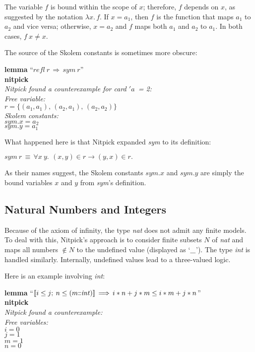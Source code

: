 \documentclass[a4paper,12pt]{article}
\def\Colon{\mathord{:\mkern-1.5mu:}}
\def\unk{{\_}}
\renewcommand\_{\hbox{\textunderscore\kern-.05ex}}
\begin{document}
The variable $f$ is bound within the scope of $x$; therefore, $f$ depends on
$x$, as suggested by the notation $\lambda x.\,f$. If $x = a_1$, then $f$ is the
function that maps $a_1$ to $a_2$ and vice versa; otherwise, $x = a_2$ and $f$
maps both $a_1$ and $a_2$ to $a_1$. In both cases, $f~x \not= x$.

The source of the Skolem constants is sometimes more obscure:

\prew
\textbf{lemma} ``$\mathit{refl}~r\,\Longrightarrow\, \mathit{sym}~r$'' \\
\textbf{nitpick} \\[2\smallskipamount]
\slshape
Nitpick found a counterexample for \textit{card} $'a$~= 2: \\[2\smallskipamount]
\hbox{}\qquad Free variable: \nopagebreak \\
\hbox{}\qquad\qquad $r = \{(a_1, a_1),\, (a_2, a_1),\, (a_2, a_2)\}$ \\
\hbox{}\qquad Skolem constants: \nopagebreak \\
\hbox{}\qquad\qquad $\mathit{sym}.x = a_2$ \\
\hbox{}\qquad\qquad $\mathit{sym}.y = a_1$
\postw

What happened here is that Nitpick expanded \textit{sym} to its definition:

\prew
$\mathit{sym}~r \,\equiv\,
 \forall x\> y.\,\> (x, y) \in r \longrightarrow (y, x) \in r.$
\postw

As their names suggest, the Skolem constants $\mathit{sym}.x$ and
$\mathit{sym}.y$ are simply the bound variables $x$ and $y$
from \textit{sym}'s definition.

\subsection{Natural Numbers and Integers}
\label{natural-numbers-and-integers}

Because of the axiom of infinity, the type \textit{nat} does not admit any
finite models. To deal with this, Nitpick's approach is to consider finite
subsets $N$ of \textit{nat} and maps all numbers $\notin N$ to the undefined
value (displayed as `$\unk$'). The type \textit{int} is handled similarly.
Internally, undefined values lead to a three-valued logic.

Here is an example involving \textit{int\/}:

\prew
\textbf{lemma} ``$\lbrakk i \le j;\> n \le (m{\Colon}\mathit{int})\rbrakk \,\Longrightarrow\, i * n + j * m \le i * m + j * n$'' \\
\textbf{nitpick} \\[2\smallskipamount]
\slshape Nitpick found a counterexample: \\[2\smallskipamount]
\hbox{}\qquad Free variables: \nopagebreak \\
\hbox{}\qquad\qquad $i = 0$ \\
\hbox{}\qquad\qquad $j = 1$ \\
\hbox{}\qquad\qquad $m = 1$ \\
\hbox{}\qquad\qquad $n = 0$
\postw
\end{document}
